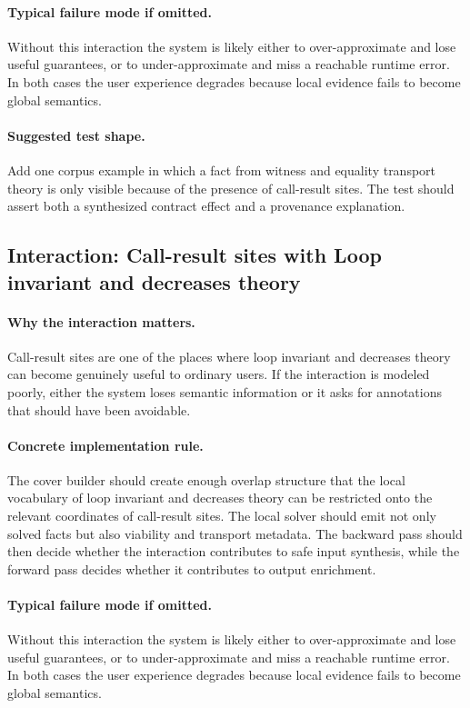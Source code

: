 \documentclass[11pt]{report}
\theoremstyle{definition}
\theoremstyle{plain}
\begin{document}
\paragraph{Typical failure mode if omitted.}
Without this interaction the system is likely either to over-approximate and
lose useful guarantees, or to under-approximate and miss a reachable runtime
error. In both cases the user experience degrades because local evidence
fails to become global semantics.

\paragraph{Suggested test shape.}
Add one corpus example in which a fact from witness and equality transport theory is only
visible because of the presence of call-result sites. The test should
assert both a synthesized contract effect and a provenance explanation.

\subsection{Interaction: Call-result sites with Loop invariant and decreases theory}

\paragraph{Why the interaction matters.}
Call-result sites are one of the places where loop invariant and decreases theory can become
genuinely useful to ordinary users. If the interaction is modeled poorly,
either the system loses semantic information or it asks for annotations that
should have been avoidable.

\paragraph{Concrete implementation rule.}
The cover builder should create enough overlap structure that the local
vocabulary of loop invariant and decreases theory can be restricted onto the relevant
coordinates of call-result sites. The local solver should emit not only
solved facts but also viability and transport metadata. The backward pass
should then decide whether the interaction contributes to safe input
synthesis, while the forward pass decides whether it contributes to output
enrichment.

\paragraph{Typical failure mode if omitted.}
Without this interaction the system is likely either to over-approximate and
lose useful guarantees, or to under-approximate and miss a reachable runtime
error. In both cases the user experience degrades because local evidence
fails to become global semantics.
\end{document}
